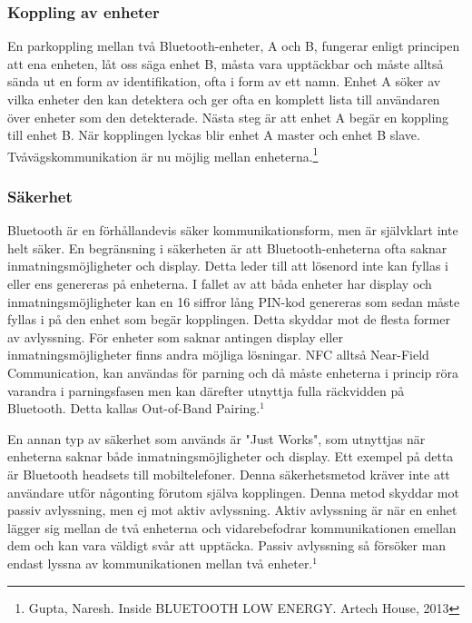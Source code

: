 \documentclass[a4paper,12pt,fleqn]{article}
\begin{document}
\subsubsection{Koppling av enheter}
En parkoppling mellan två Bluetooth-enheter, A och B, fungerar enligt principen att ena enheten, låt oss säga enhet B, måsta vara upptäckbar och måste alltså sända ut en form av identifikation, ofta i form av ett namn. Enhet A söker av vilka enheter den kan detektera och ger ofta en komplett lista till användaren över enheter som den detekterade. Nästa steg är att enhet A begär en koppling till enhet B. När kopplingen lyckas blir enhet A master och enhet B slave. Tvåvägskommunikation är nu möjlig mellan enheterna.\footnote{Gupta, Naresh. Inside BLUETOOTH LOW ENERGY. Artech House, 2013}

\subsubsection{Säkerhet}
Bluetooth är en förhållandevis säker kommunikationsform, men är självklart inte helt säker. En begränsning i säkerheten är att Bluetooth-enheterna ofta saknar inmatningsmöjligheter och display. Detta leder till att lösenord inte kan fyllas i eller ens genereras på enheterna. I fallet av att båda enheter har display och inmatningsmöjligheter kan en 16 siffror lång PIN-kod genereras som sedan måste fyllas i på den enhet som begär kopplingen. Detta skyddar mot de flesta former av avlyssning.
För enheter som saknar antingen display eller inmatningsmöjligheter finns andra möjliga lösningar. NFC alltså Near-Field Communication, kan användas för parning och då måste enheterna i princip röra varandra i parningsfasen men kan därefter utnyttja fulla räckvidden på Bluetooth. Detta kallas Out-of-Band Pairing.$^1$

En annan typ av säkerhet som används är "Just Works", som utnyttjas när enheterna saknar både inmatningsmöjligheter och display. Ett exempel på detta är Bluetooth headsets till mobiltelefoner. Denna säkerhetsmetod kräver inte att användare utför någonting förutom själva kopplingen. Denna metod skyddar mot passiv avlyssning, men ej mot aktiv avlyssning. 
Aktiv avlyssning är när en enhet lägger sig mellan de två enheterna och vidarebefodrar kommunikationen emellan dem och kan vara väldigt svår att upptäcka.
Passiv avlyssning så försöker man endast lyssna av kommunikationen mellan två enheter.$^1$
 
\end{document}
